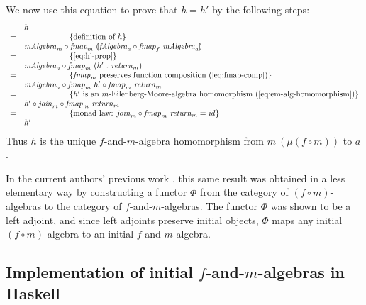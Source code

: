 \documentclass{jfp1}
\newcommand{\fold}[1]{\llparenthesis #1 \rrparenthesis}
\newcommand{\eqAnnotation}[1]{\hspace{2cm}\left\{\textrm{#1}\right\}}
\begin{document}
\begin{proof*}
\begin{enumerate}
    We now use this equation to prove that $h=h'$ by the following
    steps:
    \begin{displaymath}
      \begin{array}{cl}
        & h \\
        =&\eqAnnotation{definition of $h$} \\
        &\mathit{mAlgebra}_m \circ \mathit{fmap}_m~\fold{\mathit{fAlgebra}_a \circ \mathit{fmap}_f~\mathit{mAlgebra}_a} \\
        =&\eqAnnotation{\autoref{eq:h'-prop}} \\
        &\mathit{mAlgebra}_a \circ \mathit{fmap}_m~(h' \circ \mathit{return}_m) \\
        =&\eqAnnotation{$\mathit{fmap}_m$ preserves function composition (\autoref{eq:fmap-comp})} \\
        &\mathit{mAlgebra}_a \circ \mathit{fmap}_m~{h'} \circ \mathit{fmap}_m~\mathit{return}_m \\
        =&\eqAnnotation{$h'$ is an $m$-Eilenberg-Moore-algebra homomorphism (\autoref{eq:em-alg-homomorphism})} \\
        &h' \circ \mathit{join}_m \circ \mathit{fmap}_m~\mathit{return}_m \\
        =&\eqAnnotation{monad law: $\mathit{join}_m \circ \mathit{fmap}_m~\mathit{return}_m = \mathit{id}$} \\
        &h'
      \end{array}
    \end{displaymath}
    Thus $h$ is the unique $f$-and-$m$-algebra homomorphism from
    $m~(\mu (f \circ m))$ to $a$. \mathproofbox
  \end{enumerate}
\end{proof*}

In the current authors' previous work \cite{atkey12fibrational}, this
same result was obtained in a less elementary way by constructing a
functor $\Phi$ from the category of $(f \circ m)$-algebras to the
category of $f$-and-$m$-algebras. The functor $\Phi$ was shown to be a
left adjoint, and since left adjoints preserve initial objects, $\Phi$
maps any initial $(f \circ m)$-algebra to an initial
$f$-and-$m$-algebra.


\subsection{Implementation of initial $f$-and-$m$-algebras in Haskell}
\label{sec:f-and-m-alg-impl}
\end{document}
